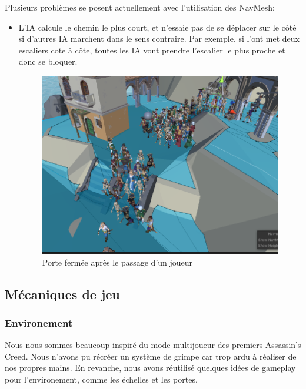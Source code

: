 \documentclass[french, 12pt]{article}
\begin{document}
    Plusieurs problèmes se posent actuellement avec l'utilisation des NavMesh:
    \begin{itemize}
        \item L'IA calcule le chemin le plus court, et n'essaie pas de se déplacer sur le côté si d'autres IA marchent dans le sens contraire. Par exemple, si l'ont met deux escaliers cote à côte, toutes les IA vont prendre l'escalier le plus proche et donc se bloquer.\\
        \begin{figure}[hbt!]
            \centering
            \includegraphics[scale=0.5]{ia_stairs_bug.png}
            \caption{Porte fermée après le passage d'un joueur}
        \end{figure}
    \end{itemize}



    \subsection{Mécaniques de jeu}

        \subsubsection{Environement}
            Nous nous sommes beaucoup inspiré du mode multijoueur des premiers Assassin's Creed.
            Nous n'avons pu récréer un système de grimpe car trop ardu à réaliser de nos propres mains.
            En revanche, nous avons réutilisé quelques idées de gameplay pour l'environement, comme les échelles et les portes.\\
\end{document}
